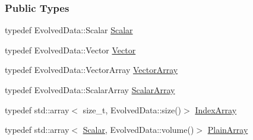 \subsubsection*{Public Types}
\begin{DoxyCompactItemize}
\item 
typedef Evolved\+Data\+::\+Scalar \mbox{\hyperlink{class_a_rchain_a707e42a79e4744424a34c9007e84ee07}{Scalar}}
\item 
typedef Evolved\+Data\+::\+Vector \mbox{\hyperlink{class_a_rchain_ab9b518a463f750eb54e002842b66e8dd}{Vector}}
\item 
typedef Evolved\+Data\+::\+Vector\+Array \mbox{\hyperlink{class_a_rchain_a019fbadb9f4e5892736d9127537338bb}{Vector\+Array}}
\item 
typedef Evolved\+Data\+::\+Scalar\+Array \mbox{\hyperlink{class_a_rchain_a206c7f2ff7ce15041a20d327d28b7be3}{Scalar\+Array}}
\item 
typedef std\+::array$<$ size\+\_\+t, Evolved\+Data\+::size()$>$ \mbox{\hyperlink{class_a_rchain_aae40d4b5881eecfc960814f9e368215d}{Index\+Array}}
\item 
typedef std\+::array$<$ \mbox{\hyperlink{class_a_rchain_a707e42a79e4744424a34c9007e84ee07}{Scalar}}, Evolved\+Data\+::volume()$>$ \mbox{\hyperlink{class_a_rchain_a829aca51411c08ffd518294770a374d5}{Plain\+Array}}
\end{DoxyCompactItemize}
